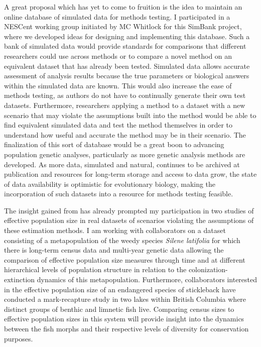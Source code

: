 A great proposal which has yet to come to fruition is the idea to maintain an online database of simulated data for methods testing. I participated in a NESCent working group initiated by MC Whitlock for this SimBank project, where we developed ideas for designing and implementing this database. Such a bank of simulated data would provide standards for comparisons that different researchers could use across methods or to compare a novel method on an equivalent dataset that has already been tested. Simulated data allows accurate assessment of analysis results because the true parameters or biological answers within the simulated data are known. This would also increase the ease of methods testing, as authors do not have to continually generate their own test datasets. Furthermore, researchers applying a method to a dataset with a new scenario that may violate the assumptions built into the method would be able to find equivalent simulated data and test the method themselves in order to understand how useful and accurate the method may be in their scenario. The finalization of this sort of database would be a great boon to advancing population genetic analyses, particularly as more genetic analysis methods are developed. As more data, simulated and natural, continues to be archived at publication and resources for long-term storage and access to data grow, the state of data availability is optimistic for evolutionary biology, making the incorporation of such datasets into a resource for methods testing feasible.

The insight gained from  has already prompted my participation in two studies of effective population size in real datasets of scenarios violating the assumptions of these estimation methods. I am working with collaborators on a dataset consisting of a metapopulation of the weedy species \emph{Silene latifolia} for which there is long-term census data and multi-year genetic data allowing the comparison of effective population size measures through time and at different hierarchical levels of population structure in relation to the colonization-extinction dynamics of this metapopulation. Furthermore, collaborators interested in the effective population size of an endangered species of stickleback have conducted a mark-recapture study in two lakes within British Columbia where distinct groups of benthic and limnetic fish live. Comparing census sizes to effective population sizes in this system will provide insight into the dynamics between the fish morphs and their respective levels of diversity for conservation purposes.

